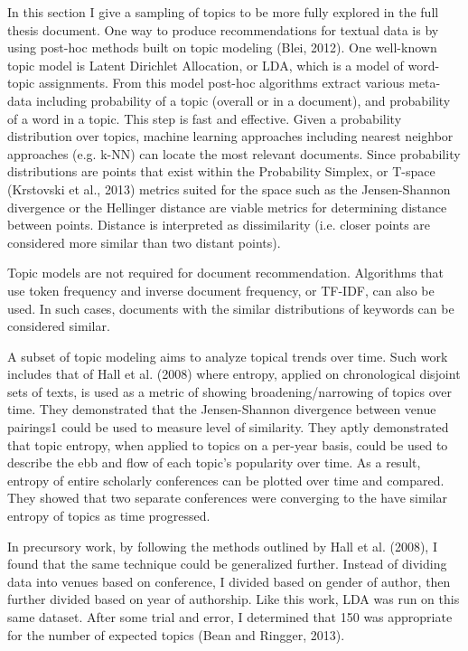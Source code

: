 In this section I give a sampling of topics to be more fully explored in the full thesis document.
One way to produce recommendations for textual data is by using post-hoc methods built on topic modeling (Blei, 2012). One well-known topic model is Latent Dirichlet Allocation, or LDA, which is a model of word-topic assignments. From this model post-hoc algorithms extract various meta-data including probability of a topic (overall or in a document), and probability of a word in a topic. This step is fast and effective. Given a probability distribution over topics, machine learning approaches including nearest neighbor approaches (e.g. k-NN) can locate the most relevant documents. Since probability distributions are points that exist within the Probability Simplex, or T-space (Krstovski et al., 2013) metrics suited for the space such as the Jensen-Shannon divergence or the Hellinger distance are viable metrics for determining distance between points. Distance is interpreted as dissimilarity (i.e. closer points are considered more similar than two distant points).

Topic models are not required for document recommendation. Algorithms that use token frequency and inverse document frequency, or TF-IDF, can also be used. In such cases, documents with the similar distributions of keywords can be considered similar.

A subset of topic modeling aims to analyze topical trends over time. Such work includes that of Hall et al. (2008) where entropy, applied on chronological disjoint sets of texts, is used as a metric of showing broadening/narrowing of topics over time. They demonstrated that the Jensen-Shannon divergence between venue pairings1 could be used to measure level of similarity. They aptly demonstrated that topic entropy, when applied to topics on a per-year basis, could be used to describe the ebb and flow of each topic’s popularity over time. As a result, entropy of entire scholarly conferences can be plotted over time and compared. They showed that two separate conferences were converging to the have similar entropy of topics as time progressed.

In precursory work, by following the methods outlined by Hall et al. (2008), I found that the same technique could be generalized further. Instead of dividing data into venues based on conference, I divided based on gender of author, then further divided based on year of authorship. Like this work, LDA was run on this same dataset. After some trial and error, I determined that 150 was appropriate for the number of expected topics (Bean and Ringger, 2013).

